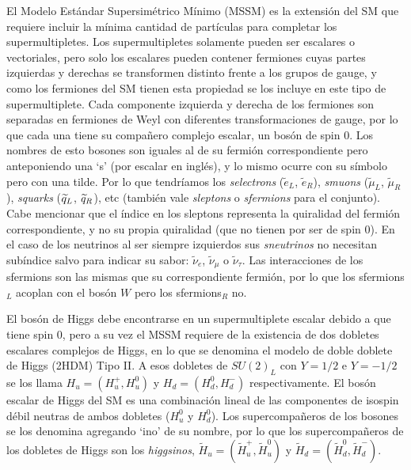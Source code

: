 El Modelo Estándar Supersimétrico Mínimo (MSSM) es la extensión del SM que requiere incluir la mínima cantidad de partículas para completar los supermultipletes. Los supermultipletes solamente pueden ser escalares o vectoriales, pero solo los escalares pueden contener fermiones cuyas partes izquierdas y derechas se transformen distinto frente a los grupos de gauge, y como los fermiones del SM tienen esta propiedad se los incluye en este tipo de supermultiplete. Cada componente izquierda y derecha de los fermiones son separadas en fermiones de Weyl con diferentes transformaciones de gauge, por lo que cada una tiene su compañero complejo escalar, un bosón de spin 0. Los nombres de esto bosones son iguales al de su fermión correspondiente pero anteponiendo una `s' (por escalar en inglés), y lo mismo ocurre con su símbolo pero con una tilde. Por lo que tendríamos los \textit{selectrons} ($\tilde{e}_L$, $\tilde{e}_R$), \textit{smuons} ($\tilde{\mu}_L$, $\tilde{\mu}_R$), \textit{squarks} ($\widetilde{q}_L$, $\widetilde{q}_R$), etc (también vale \textit{sleptons} o \textit{sfermions} para el conjunto). Cabe mencionar que el índice en los sleptons representa la quiralidad del fermión correspondiente, y no su propia quiralidad (que no tienen por ser de spin 0). En el caso de los neutrinos al ser siempre izquierdos sus \textit{sneutrinos} no necesitan subíndice salvo para indicar su sabor: $\tilde{\nu}_e$, $\tilde{\nu}_{\mu}$ o $\tilde{\nu}_{\tau}$. Las interacciones de los sfermions son las mismas que su correspondiente fermión, por lo que los sfermions$_L$ acoplan con el bosón $W$ pero los sfermions$_R$ no.

El bosón de Higgs debe encontrarse en un supermultiplete escalar debido a que tiene spin 0, pero a su vez el MSSM requiere de la existencia de dos dobletes escalares complejos de Higgs, en lo que se denomina el modelo de doble doblete de Higgs (2HDM) Tipo II. A esos dobletes de $SU(2)_L$ con $Y=1/2$ e $Y=-1/2$ se los llama $H_u=(H_u^+, H_u^0)$ y $H_d=(H_d^0, H_d^-)$ respectivamente. El bosón escalar de Higgs del SM es una combinación lineal de las componentes de isospin débil neutras de ambos dobletes ($H_u^0$ y $H_d^0$). Los supercompañeros de los bosones se los denomina agregando `ino' de su nombre, por lo que los supercompañeros de los dobletes de Higgs son los \textit{higgsinos}, $\widetilde{H}_u=(\widetilde{H}_u^+, \widetilde{H}_u^0)$ y $\widetilde{H}_d=(\widetilde{H}_d^0, \widetilde{H}_d^-)$.

